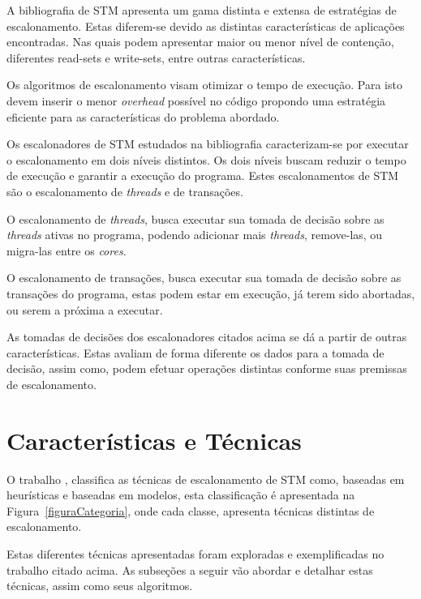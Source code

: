 \documentclass[ti]{texufpel}
\begin{document}
  A bibliografia de STM apresenta um gama distinta e extensa de estratégias de escalonamento. Estas diferem-se devido as distintas características de aplicações encontradas. Nas quais podem apresentar maior ou menor nível de contenção, diferentes read-sets e write-sets, entre outras características.

  Os algoritmos de escalonamento visam otimizar o tempo de execução. Para isto devem inserir o menor \emph{overhead} possível no código propondo uma estratégia eficiente para as características do problema abordado.

  Os escalonadores de STM estudados na bibliografia caracterizam-se por executar o escalonamento em dois níveis distintos. Os dois níveis buscam reduzir o tempo de execução e garantir a execução do programa. Estes escalonamentos de STM são o escalonamento de \emph{threads} e de transações.

  O escalonamento de \emph{threads}, busca executar sua tomada de decisão sobre as \emph{threads} ativas no programa, podendo adicionar mais \emph{threads}, remove-las, ou migra-las entre os \emph{cores}.

  O escalonamento de transações, busca executar sua tomada de decisão sobre as transações do programa, estas podem estar em execução, já terem sido abortadas, ou serem a próxima a executar.

  As tomadas de decisões dos escalonadores citados acima se dá a partir de outras características. Estas avaliam de forma diferente os dados para a tomada de decisão, assim como, podem efetuar operações distintas conforme suas premissas de escalonamento.

\section{Características e Técnicas}

O trabalho \cite{sanzo17}, classifica as técnicas de escalonamento de STM como, baseadas em heurísticas e baseadas em modelos, esta classificação é apresentada na Figura~\ref{figuraCategoria}, onde cada classe, apresenta técnicas distintas de escalonamento.

Estas diferentes técnicas apresentadas foram exploradas e exemplificadas no trabalho citado acima. As subseções a seguir vão abordar e detalhar estas técnicas, assim como seus algoritmos.
\end{document}
